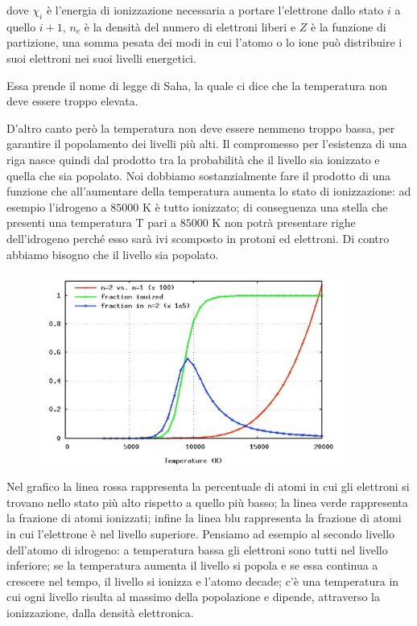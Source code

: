 dove $\chi_i$ è l'energia di ionizzazione necessaria a portare l'elettrone dallo stato $i$ a quello $i+1$, $n_e$ è la densità del numero di elettroni liberi e $Z$ è la funzione di partizione, una somma pesata dei modi in cui l'atomo o lo ione può distribuire i suoi elettroni nei suoi livelli energetici.

Essa prende il nome di legge di Saha, la quale ci dice che la temperatura non deve essere troppo elevata.

D'altro canto però la temperatura non deve essere nemmeno troppo bassa, per garantire il popolamento dei livelli più alti. Il compromesso per l'esistenza di una riga nasce quindi dal prodotto tra la probabilità che il livello sia ionizzato e quella che sia popolato. Noi dobbiamo sostanzialmente fare il prodotto di una funzione che all'aumentare della temperatura aumenta lo stato di ionizzazione: ad esempio l'idrogeno a $85000$ K è tutto ionizzato; di conseguenza una stella che presenti una temperatura T pari a $85000$ K non potrà presentare righe dell'idrogeno perché esso sarà ivi scomposto in protoni ed elettroni. Di contro abbiamo bisogno che il livello sia popolato.

\begin{figure}[H]
  \centering
  \includegraphics[width=10cm]{Saha.jpg}
  \label{fig:Boltzmann*Saha }
\end{figure}

Nel grafico la linea rossa rappresenta la percentuale di atomi in cui gli elettroni si trovano nello stato più alto rispetto a quello più basso; la linea verde rappresenta la frazione di atomi ionizzati; infine la linea blu rappresenta la frazione di atomi in cui l'elettrone è nel livello superiore. Pensiamo ad esempio al secondo livello dell'atomo di idrogeno: a temperatura bassa gli elettroni sono tutti nel livello inferiore; se la temperatura aumenta il livello si popola e se essa continua a crescere nel tempo, il livello si ionizza e l'atomo decade; c'è una temperatura in cui ogni livello risulta al massimo della popolazione e dipende, attraverso la ionizzazione, dalla densità elettronica.

